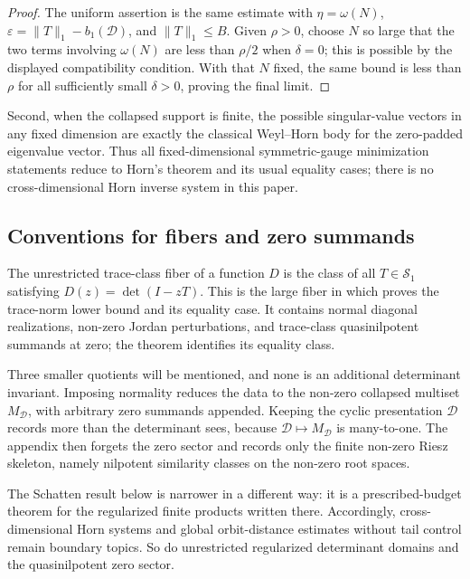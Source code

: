 \begin{proof}
  The uniform assertion is the same estimate with
  \(\eta=\omega(N)\), \(\varepsilon=
  \|T\|_1-b_1(\mathcal D)\), and \(\|T\|_1\le B\).  Given
  \(\rho>0\), choose \(N\) so large that the two terms involving
  \(\omega(N)\) are less than \(\rho/2\) when \(\delta=0\); this is possible
  by the displayed compatibility condition.  With that \(N\) fixed, the same
  bound is less than \(\rho\) for all sufficiently small \(\delta>0\), proving
  the final limit.
\end{proof}

Second, when the collapsed support is finite, the possible singular-value
vectors in any fixed dimension are exactly the classical Weyl--Horn body for
the zero-padded eigenvalue vector.  Thus all fixed-dimensional symmetric-gauge
minimization statements reduce to Horn's theorem and its usual equality cases;
there is no cross-dimensional Horn inverse system in this paper.



\subsection{Conventions for fibers and zero summands}

The unrestricted trace-class fiber of a function \(D\) is the class of all
\(T\in\mathcal S_1\) satisfying \(D(z)=\det(I-zT)\).  This is the large fiber in
which  proves the trace-norm lower bound
and its equality case.  It contains normal diagonal realizations, non-zero
Jordan perturbations, and trace-class quasinilpotent summands at zero; the
theorem identifies its equality class.

Three smaller quotients will be mentioned, and none is an additional
determinant invariant.  Imposing normality reduces the data to the non-zero
collapsed multiset \(M_{\mathcal D}\), with arbitrary zero summands appended.
Keeping the cyclic presentation \(\mathcal D\) records more than the determinant
sees, because \(\mathcal D\mapsto M_{\mathcal D}\) is many-to-one.  The appendix
then forgets the zero sector and records only the finite non-zero Riesz
skeleton, namely nilpotent similarity classes on the non-zero root spaces.

The Schatten result below is narrower in a different way: it is a
prescribed-budget theorem for the regularized finite products written there.
Accordingly, cross-dimensional Horn systems and global orbit-distance estimates
without tail control remain boundary topics.  So do unrestricted regularized
determinant domains and the quasinilpotent zero sector.
